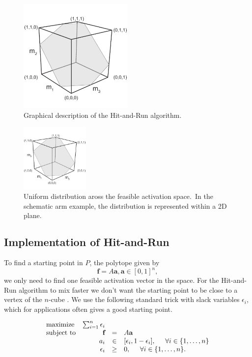 \begin{figure}[h]
\centering
\includegraphics[width=0.5\textwidth,page=10]{sections/figs/HitandRunSchematics_all.pdf}
\caption{Graphical description of the Hit-and-Run algorithm.}
\label{fig:hitruncube}
\end{figure}

\begin{figure}[h]
\centering
\includegraphics[width=0.3\textwidth,page=9]{sections/figs/HitandRunSchematics_all.pdf}
\caption{Uniform distribution aross the feasible activation space.\ In the schematic arm example, the distribution is represented within a 2D plane.}
\label{fig:posthitrun_distribution}
\end{figure}

\subsection*{Implementation of Hit-and-Run}
To find a starting point in $P$, the polytope given by
\[\textbf{f} = A\textbf{a}, \textbf{a} \in [0,1]^n,\]
we only need to find one feasible activation vector in the space.
For the Hit-and-Run algorithm to mix faster we don't want the starting point to be close to a vertex of the $n$-cube \cite{Lovasz}.
We use the following standard trick with slack variables $\epsilon_i$, which for applications often gives a good starting point.

\begin{equation}\label{eq:LP_r}
\begin{array}{lrcl}
\mbox{maximize} & \sum_{i=1}^n \epsilon_i \\ 
\mbox{subject to} & \textbf{f} &=& A\textbf{a}\\
  & a_i &\in& [\epsilon_i, 1- \epsilon_i], \hspace{5mm} \forall i \in \{1,\dots,n\}  \\
  & \epsilon_i &\geq& 0, \hspace{5mm} \forall i \in \{1,\dots,n\}.  
\end{array}
\end{equation}


